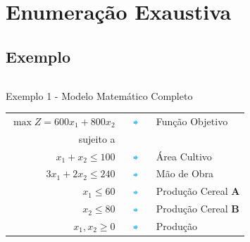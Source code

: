 \section{Enumeração Exaustiva}
\subsection{Exemplo}


\begin{frame}
	{
		\begin{columns}
			\begin{column}{0.7\textwidth}
				\centering
				\begin{exampleblock}{Exemplo 1 - Modelo Matemático Completo}
					\scriptsize
					\begin{table}
						\begin{tabular}{r c l}
							$ \max Z = 600x_1+800x_2$ & \includegraphics[width=0.8cm,height=0.2cm]{seta2.png} & Função Objetivo \\
							sujeito a & & \\
							$x_1+x_2 \le 100$ & \includegraphics[width=0.8cm,height=0.2cm]{seta2.png}& Área Cultivo \\
							$3x_1+2x_2 \le 240$ & \includegraphics[width=0.8cm,height=0.2cm]{seta2.png}& Mão de Obra \\
							$x_1 \le 60 $ & \includegraphics[width=0.8cm,height=0.2cm]{seta2.png}& Produção Cereal \textbf{A} \\
							$x_2 \le 80 $ &\includegraphics[width=0.8cm,height=0.2cm]{seta2.png} & Produção Cereal \textbf{B} \\
							$x_1, x_2 \ge 0$ & \includegraphics[width=0.8cm,height=0.2cm]{seta2.png}& Produção \\
						\end{tabular}
					\end{table}

\end{exampleblock}
\end{column}
\end{columns}}
\end{frame}
